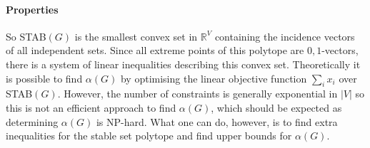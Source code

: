 \paragraph{Properties} So STAB$(G)$ is the smallest convex set in $\mathbb{R}^V$ containing the incidence vectors of all independent sets. Since all extreme points of this polytope are $0,1$-vectors, there is a system of linear inequalities describing this convex set. Theoretically it is possible to find $\alpha(G)$ by optimising the linear objective function $\sum_i x_i$ over STAB$(G)$. However, the number of constraints is generally exponential in $|V|$ so this is not an efficient approach to find $\alpha(G)$, which should be expected as determining $\alpha(G)$ is NP-hard. What one can do, however, is to find extra inequalities for the stable set polytope and find upper bounds for $\alpha(G)$.

